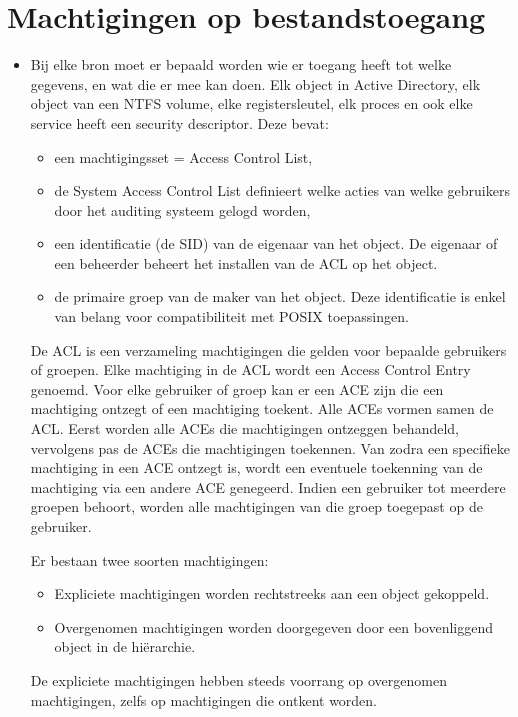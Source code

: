 	\section{Machtigingen op bestandstoegang }
	\begin{enumerate}
		 {
			\begin{itemize}
				\item Bij elke bron moet er bepaald worden wie er toegang heeft tot welke gegevens, en wat die er mee kan doen. Elk object in Active Directory, elk object van een NTFS volume, elke registersleutel, elk proces en ook elke service heeft een security descriptor. Deze bevat:
				\begin{itemize}
					\item een machtigingsset = Access Control List,
					\item de System Access Control List definieert welke acties van welke gebruikers door het auditing systeem gelogd worden,
					\item een identificatie (de SID) van de eigenaar van het object. De eigenaar of een beheerder beheert het installen van de ACL op het object.
					\item de primaire groep van de maker van het object. Deze identificatie is enkel van belang voor compatibiliteit met POSIX toepassingen.
				\end{itemize}
				De ACL is een verzameling machtigingen die gelden voor bepaalde gebruikers of groepen. Elke machtiging in de ACL wordt een Access Control Entry genoemd. Voor elke gebruiker of groep kan er een ACE zijn die een machtiging ontzegt of een machtiging toekent. Alle ACEs vormen samen de ACL. Eerst worden alle ACEs die machtigingen ontzeggen behandeld, vervolgens pas de ACEs die machtigingen toekennen. Van zodra een specifieke machtiging in een ACE ontzegt is, wordt een eventuele toekenning van de machtiging via een andere ACE genegeerd. Indien een gebruiker tot meerdere groepen behoort, worden alle machtigingen van die groep toegepast op de gebruiker. 

				Er bestaan twee soorten machtigingen:
				\begin{itemize}
					\item Expliciete machtigingen worden rechtstreeks aan een object gekoppeld.
					\item Overgenomen machtigingen worden doorgegeven door een bovenliggend object in de hiërarchie. 
				\end{itemize}
				De expliciete machtigingen hebben steeds voorrang op overgenomen machtigingen, zelfs op machtigingen die ontkent worden.
			\end{itemize}

}
\end{enumerate}
